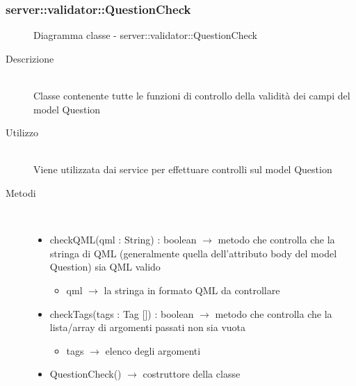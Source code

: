 \subsubsection[QuestionCheck]{server::validator::QuestionCheck}
\begin{figure}[H]
	\centering
	\caption{Diagramma classe - server::validator::QuestionCheck}
\end{figure}\begin{description}
\item[Descrizione] \hfill \\
Classe contenente tutte le funzioni di controllo della validità dei campi del model Question
\item[Utilizzo] \hfill \\
Viene utilizzata dai service per effettuare controlli sul model Question
\item[Metodi] \hfill \\
\vspace{-7mm}
\begin{itemize}
	\item checkQML(qml : String) : boolean $\rightarrow$ metodo che controlla che la stringa di QML (generalmente quella dell'attributo body del model Question) sia QML valido\begin{itemize}
		\item qml $\rightarrow$ la stringa in formato QML da controllare
	\end{itemize}
	
	\item checkTags(tags : Tag []) : boolean $\rightarrow$ metodo che controlla che la lista/array di argomenti passati non sia vuota\begin{itemize}
		\item tags $\rightarrow$ elenco degli argomenti
	\end{itemize}
	
	\item QuestionCheck() $\rightarrow$ costruttore della classe
\end{itemize}

\end{description}

\vspace{0.5cm}
\hypertarget{server::validator::AnswerCheck}{}
